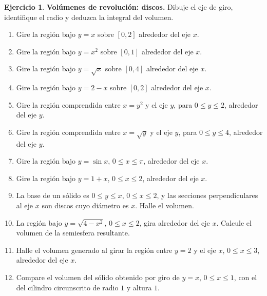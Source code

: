 \documentclass[12pt]{article}
\theoremstyle{definition}
\newtheorem{Ejer}[teorema]{Ejercicio}
\theoremstyle{remark}
\begin{document}
\begin{Ejer}\textbf{Volúmenes de revolución: discos.} Dibuje el eje de giro, identifique el radio y deduzca la integral del volumen.
\begin{enumerate}[resume=banco3]
\item Gire la región bajo $y=x$ sobre $[0,2]$ alrededor del eje $x$.
\item Gire la región bajo $y=x^2$ sobre $[0,1]$ alrededor del eje $x$.
\item Gire la región bajo $y=\sqrt x$ sobre $[0,4]$ alrededor del eje $x$.
\item Gire la región bajo $y=2-x$ sobre $[0,2]$ alrededor del eje $x$.
\item Gire la región comprendida entre $x=y^2$ y el eje $y$, para $0\le y\le2$, alrededor del eje $y$.
\item Gire la región comprendida entre $x=\sqrt y$ y el eje $y$, para $0\le y\le4$, alrededor del eje $y$.
\item Gire la región bajo $y=\sin x$, $0\le x\le\pi$, alrededor del eje $x$.
\item Gire la región bajo $y=1+x$, $0\le x\le2$, alrededor del eje $x$.
\item La base de un sólido es $0\le y\le x$, $0\le x\le2$, y las secciones perpendiculares al eje $x$ son discos cuyo diámetro es $x$. Halle el volumen.
\item La región bajo $y=\sqrt{4-x^2}$, $0\le x\le2$, gira alrededor del eje $x$. Calcule el volumen de la semiesfera resultante.
\item Halle el volumen generado al girar la región entre $y=2$ y el eje $x$, $0\le x\le3$, alrededor del eje $x$.
\item Compare el volumen del sólido obtenido por giro de $y=x$, $0\le x\le1$, con el del cilindro circunscrito de radio $1$ y altura $1$.
\end{enumerate}
\end{Ejer}
\end{document}
